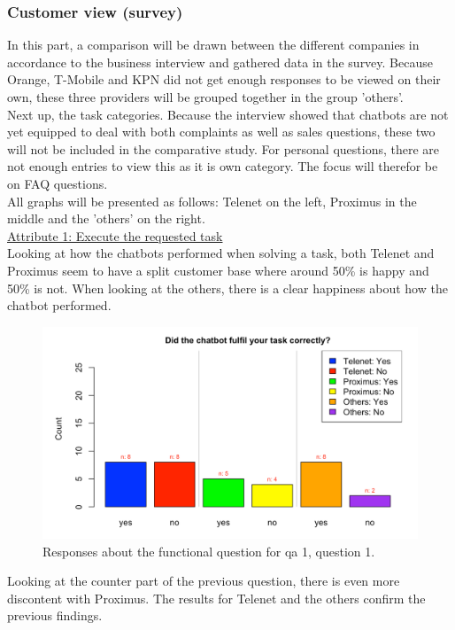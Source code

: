 \subsubsection{Customer view (survey)}
In this part, a comparison will be drawn between the different companies in accordance to the business interview and gathered data in the survey. Because Orange, T-Mobile and KPN did not get enough responses to be viewed on their own, these three providers will be grouped together in the group 'others'.\\
\break
Next up, the task categories. Because the interview showed that chatbots are not yet equipped to deal with both complaints as well as sales questions, these two will not be included in the comparative study. For personal questions, there are not enough entries to view this as it is own category. The focus will therefor be on FAQ questions.\\
\break
All graphs will be presented as follows: Telenet on the left, Proximus in the middle and the 'others' on the right.\\
\break
\ul{Attribute 1: Execute the requested task}\\
\break
Looking at how the chatbots performed when solving a task, both Telenet and Proximus seem to have a split customer base where around 50\% is happy and 50\% is not. When looking at the others, there is a clear happiness about how the chatbot performed.\\
\begin{figure}[!htb]
	\includegraphics[width=\linewidth, scale=0.5]{../LaTeX/Figures/Comparative/Q1.png}
	\caption{Responses about the functional question for \acrshort{qa} 1, question 1.}\label{fig:Q1}
\end{figure}
Looking at the counter part of the previous question, there is even more discontent with Proximus. The results for Telenet and the others confirm the previous findings.
